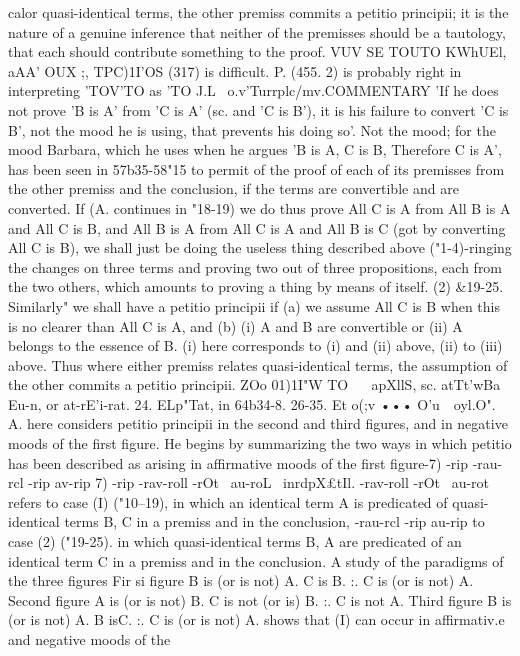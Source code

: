{{{{{calor quasi-identical terms, the other premiss commits a petitio
principii; it is the nature of a genuine inference that neither of the
premisses should be a tautology, that each should contribute
something to the proof.
VUV SE TOUTO KWhUEl, aAA' OUX ;, TPC)1I'OS (317) is difficult. P.
(455. 2) is probably right in interpreting 'TOV'TO as 'TO J.L~ o.v'Turrplc/mv.COMMENTARY
'If he does not prove 'B is A' from 'C is A' (sc. and 'C is B'), it
is his failure to convert 'C is B', not the mood he is using, that
prevents his doing so'. Not the mood; for the mood Barbara,
which he uses when he argues 'B is A, C is B, Therefore C is A',
has been seen in 57b35-58"15 to permit of the proof of each of its
premisses from the other premiss and the conclusion, if the terms
are convertible and are converted.
If (A. continues in "18-19) we do thus prove All C is A from All
B is A and All C is B, and All B is A from All C is A and All B is
C (got by converting All C is B), we shall just be doing the useless
thing described above ("1-4)-ringing the changes on three terms
and proving two out of three propositions, each from the two
others, which amounts to proving a thing by means of itself.
(2) &19-25. Similarly" we shall have a petitio principii if (a) we
assume All C is B when this is no clearer than All C is A, and (b)
(i) A and B are convertible or (ii) A belongs to the essence of B.
(i) here corresponds to (i) and (ii) above, (ii) to (iii) above.
Thus where either premiss relates quasi-identical terms, the
assumption of the other commits a petitio principii.
ZOo 01)1I"W TO ~~ apXllS, sc. atTt'wBa{ Eu-n, or at-rE'i-rat.
24. ELp"Tat, in 64b34-8.
26-35. Et o(;v ••• O'u~~oyl.O"\lous. A. here considers petitio
principii in the second and third figures, and in negative moods of
the first figure. He begins by summarizing the two ways in which
petitio has been described as arising in affirmative moods of the
first figure-7) -rip -rau-rcl -rip av-rip 7) -rip -rav-roll -rOt~ au-roL~ inrdpX£tIl.
-rav-roll -rOt~ au-rot~ refers to case (I) ("10--19), in which an identical
term A is predicated of quasi-identical terms B, C in a premiss
and in the conclusion, -rau-rcl -rip au-rip to case (2) ("19-25). in which
quasi-identical terms B, A are predicated of an identical term C
in a premiss and in the conclusion. A study of the paradigms of
the three figures
Fir si figure
B is (or is not) A.
C is B.
:. C is (or is not) A.
Second figure
A is (or is not) B.
C is not (or is) B.
:. C is not A.
Third figure
B is (or is not) A.
B isC.
:. C is (or is not) A.
shows that (I) can occur in affirmativ.e and negative moods of the
}}}}}}
